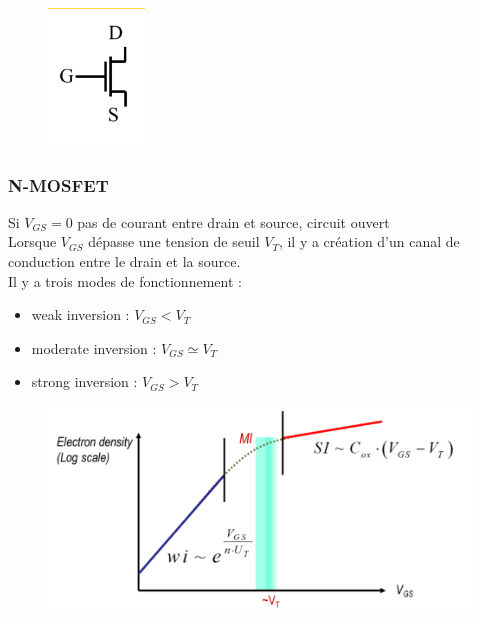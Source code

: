 \documentclass[../main.tex]{subfiles}
\begin{document}
\begin{figure}[hbt!]
    \centering
    \includegraphics[width=.4\textwidth]{IMAGES/elec/Screenshot from 2023-12-11 13-35-03.png}
\end{figure}

\subsubsection{N-MOSFET}



Si $V_{GS} = 0$ pas de courant entre drain et source, circuit ouvert\\

Lorsque $V_{GS}$ dépasse une tension de seuil $V_T$, il y a création d'un canal de conduction entre le drain et la source.\\

Il y a trois modes de fonctionnement : \begin{itemize}
    \item weak inversion : $V_{GS} < V_T$\\
    \item moderate inversion : $V_{GS} \simeq V_T$\\
    \item strong inversion : $V_{GS}>V_T$\\
\end{itemize}

\begin{figure}[hbt!]
    \centering
    \includegraphics[width=.4\textwidth]{IMAGES/elec/Screenshot from 2023-12-11 13-40-11.png}
\end{figure}
\end{document}
